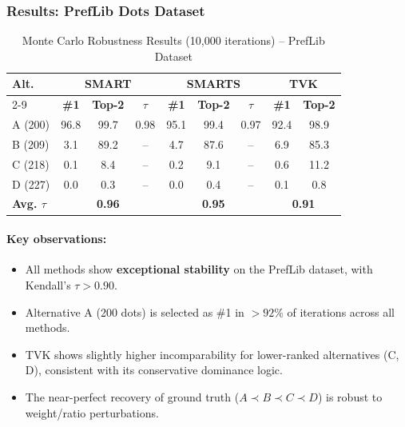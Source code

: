 \documentclass[conference]{IEEEtran}
\begin{document}
\subsubsection{Results: PrefLib Dots Dataset}

\begin{table}[H]
	\centering
	\caption{Monte Carlo Robustness Results (10,000 iterations) -- PrefLib Dataset}
	\label{tab:monte_carlo_preflib_simple}
	
	\footnotesize
	\setlength{\tabcolsep}{3pt}
	\renewcommand{\arraystretch}{1.3}
	
	\begin{tabular}{|l|c|c|c|c|c|c|c|c|}
		\hline
		\multirow{2}{*}{\textbf{Alt.}} & 
		\multicolumn{3}{c|}{\textbf{SMART}} & 
		\multicolumn{3}{c|}{\textbf{SMARTS}} & 
		\multicolumn{2}{c|}{\textbf{TVK}} \\
		\cline{2-9}
		& \textbf{\#1} & \textbf{Top-2} & $\tau$ & 
		\textbf{\#1} & \textbf{Top-2} & $\tau$ & 
		\textbf{\#1} & \textbf{Top-2} \\
		\hline
		A (200) & 96.8 & 99.7 & 0.98 & 95.1 & 99.4 & 0.97 & 92.4 & 98.9 \\
		B (209) & 3.1 & 89.2 & -- & 4.7 & 87.6 & -- & 6.9 & 85.3 \\
		C (218) & 0.1 & 8.4 & -- & 0.2 & 9.1 & -- & 0.6 & 11.2 \\
		D (227) & 0.0 & 0.3 & -- & 0.0 & 0.4 & -- & 0.1 & 0.8 \\
		\hline
		\textbf{Avg. $\tau$} & 
		\multicolumn{3}{c|}{\textbf{0.96}} & 
		\multicolumn{3}{c|}{\textbf{0.95}} & 
		\multicolumn{2}{c|}{\textbf{0.91}} \\
		\hline
	\end{tabular}
\end{table}


\paragraph{Key observations:}
\begin{itemize}
	\item All methods show \textbf{exceptional stability} on the PrefLib dataset, with Kendall's $\tau > 0.90$.
	\item Alternative A (200 dots) is selected as \#1 in $>92\%$ of iterations across all methods.
	\item TVK shows slightly higher incomparability for lower-ranked alternatives (C, D), consistent with its conservative dominance logic.
	\item The near-perfect recovery of ground truth ($A \prec B \prec C \prec D$) is robust to weight/ratio perturbations.
\end{itemize}
\end{document}
